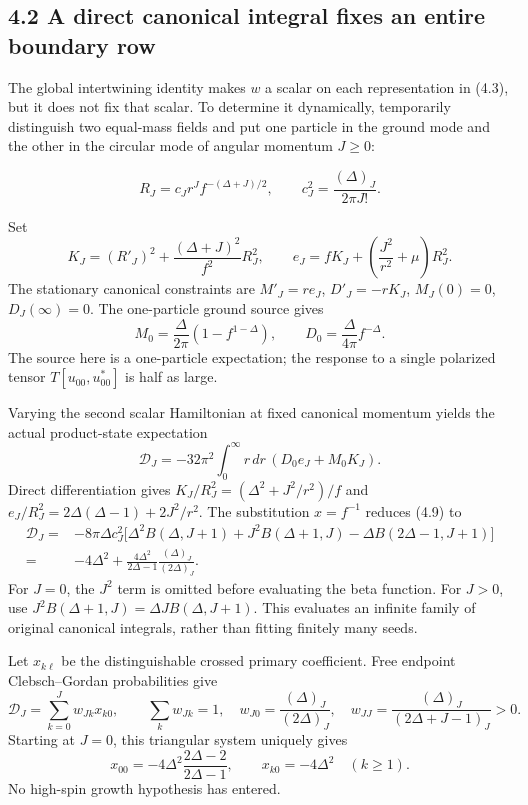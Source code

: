 \hypertarget{a-direct-canonical-integral-fixes-an-entire-boundary-row}{%
\subsection{4.2 A direct canonical integral fixes an entire boundary row}\label{a-direct-canonical-integral-fixes-an-entire-boundary-row}}

The global intertwining identity makes \(w\) a scalar on each representation in (4.3), but it does not fix that scalar. To determine it dynamically, temporarily distinguish two equal-mass fields and put one particle in the ground mode and the other in the circular mode of angular momentum \(J\ge0\):

\[
R_J=c_Jr^Jf^{-(\Delta+J)/2},\qquad
c_J^2=\frac{(\Delta)_J}{2\pi J!}.
\tag{4.7}
\]

Set \[
K_J=(R'_J)^2+\frac{(\Delta+J)^2}{f^2}R_J^2,\qquad
e_J=fK_J+\left(\frac{J^2}{r^2}+\mu\right)R_J^2 .
\] The stationary canonical constraints are \(M'_J=re_J\), \(D'_J=-rK_J\), \(M_J(0)=0\), \(D_J(\infty)=0\). The one-particle ground source gives \[
M_0=\frac{\Delta}{2\pi}(1-f^{1-\Delta}),\qquad
D_0=\frac{\Delta}{4\pi}f^{-\Delta}.
\tag{4.8}
\] The source here is a one-particle expectation; the response to a single polarized tensor \(T[u_{00},u_{00}^*]\) is half as large.

Varying the second scalar Hamiltonian at fixed canonical momentum yields the actual product-state expectation \[
\mathscr D_J=-32\pi^2\int_0^\infty r\,dr\,
(D_0e_J+M_0K_J).
\tag{4.9}
\] Direct differentiation gives \(K_J/R_J^2=(\Delta^2+J^2/r^2)/f\) and \(e_J/R_J^2=2\Delta(\Delta-1)+2J^2/r^2\). The substitution \(x=f^{-1}\) reduces (4.9) to \[
\begin{aligned}
\mathscr D_J
={}&-8\pi\Delta c_J^2
\bigl[
\Delta^2B(\Delta,J+1)
+J^2B(\Delta+1,J)
-\Delta B(2\Delta-1,J+1)
\bigr]\\
={}&-4\Delta^2+
\frac{4\Delta^2}{2\Delta-1}\frac{(\Delta)_J}{(2\Delta)_J}.
\end{aligned}
\tag{4.10}
\] For \(J=0\), the \(J^2\) term is omitted before evaluating the beta function. For \(J>0\), use \(J^2B(\Delta+1,J)=\Delta J B(\Delta,J+1)\). This evaluates an infinite family of original canonical integrals, rather than fitting finitely many seeds.

Let \(x_{k\ell}\) be the distinguishable crossed primary coefficient. Free endpoint Clebsch--Gordan probabilities give \[
\mathscr D_J=\sum_{k=0}^Jw_{Jk}x_{k0},\qquad
\sum_kw_{Jk}=1,\quad
w_{J0}=\frac{(\Delta)_J}{(2\Delta)_J},\quad
w_{JJ}=\frac{(\Delta)_J}{(2\Delta+J-1)_J}>0.
\tag{4.11}
\] Starting at \(J=0\), this triangular system uniquely gives \[
x_{00}=-4\Delta^2\frac{2\Delta-2}{2\Delta-1},
\qquad x_{k0}=-4\Delta^2\quad(k\ge1).
\tag{4.12}
\] No high-spin growth hypothesis has entered.

